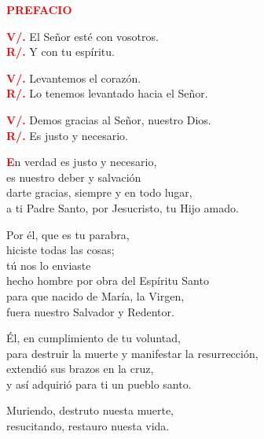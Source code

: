 \documentclass[12pt, letterpaper]{report}
\begin{document}
\Large {\bfseries \textcolor{red}{PREFACIO}} \newline

\noindent
\Large {\bfseries \textcolor{red}{V/.}} \hspace{0.5cm} El Se\~nor est\'e con vosotros. \\
\Large {\bfseries \textcolor{red}{R/.}} \hspace{0.5cm} Y con tu esp\'iritu. \newline

\noindent
\Large {\bfseries \textcolor{red}{V/.}} \hspace{0.5cm} Levantemos el coraz\'on. \\
\Large {\bfseries \textcolor{red}{R/.}} \hspace{0.5cm} Lo tenemos levantado hacia el Se\~nor. \newline

\noindent
\Large {\bfseries \textcolor{red}{V/.}} \hspace{0.5cm} Demos gracias al Se\~nor, nuestro Dios. \\
\Large {\bfseries \textcolor{red}{R/.}} \hspace{0.5cm} Es justo y necesario.

\lettrine[lines=1]{\bfseries \textcolor{red}{E}}{}\Large n verdad es justo y necesario, \\
es nuestro deber y salvaci\'on \\
darte gracias, siempre y en todo lugar, \\
a ti Padre Santo, por Jesucristo, tu Hijo amado. \newline

Por \'el, que es tu parabra, \\
hiciste todas las cosas; \\
t\'u nos lo enviaste \\
hecho hombre por obra del Esp\'iritu Santo \\
para que nacido de Mar\'ia, la Virgen, \\
fuera nuestro Salvador y Redentor. \newline

\'El, en cumplimiento de tu voluntad, \\
para destruir la muerte y manifestar la resurrecci\'on, \\
extendi\'o sus brazos en la cruz, \\
y as\'i adquiri\'o para ti un pueblo santo. \newline

Muriendo, destruto nuesta muerte, \\
resucitando, restauro nuesta vida. \newline
\end{document}
